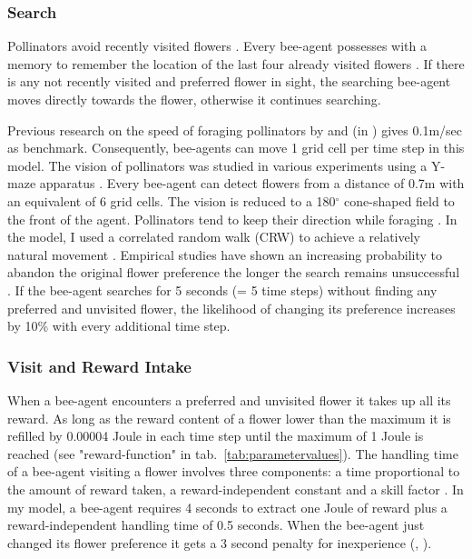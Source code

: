 \subsubsection*{Search}

Pollinators avoid recently visited flowers \citep{goulson1999foraging}. Every bee-agent possesses with a memory to remember the location of the last four already visited flowers \citep{goulson2000pollinators}. 
 If there is any not recently visited and preferred flower in sight, the searching bee-agent moves directly towards the flower, otherwise it continues searching. 

Previous research on the speed of foraging pollinators by \cite{essenberg2012explaining} and \cite{kunin1991few} (in  \citealt{kunin1996pollinator}) gives 0.1m/sec as benchmark. Consequently, bee-agents can move 1 grid cell per time step in this model. The vision of pollinators was studied in various experiments using a Y-maze apparatus \citep{dyer2008comparative, wertlen2008detection, ne2001effect}. Every bee-agent can detect flowers from a distance of 0.7m with an equivalent of 6 grid cells. The vision is reduced to a 180$^{\circ}$ cone-shaped field to the front of the agent. Pollinators tend to keep their direction while foraging \citep{waddington1980flight}. In the model, I used a correlated random walk (CRW) to achieve a relatively natural movement \citep{bartumeus2005animal, codling2008random,  pyke1992flight, viswanathan2008levy}. Empirical studies have shown an increasing probability to abandon the original flower preference the longer the search remains unsuccessful \citep{chittka1997foraging,kunin1993sex}. If the bee-agent searches for 5 seconds (= 5 time steps) without finding any preferred and unvisited flower, the likelihood of changing its preference increases by 10\% with every additional time step. \\

\subsubsection*{Visit and Reward Intake}

When a bee-agent encounters a preferred and unvisited flower it takes up all its reward. As long as the reward content of a flower lower than the maximum it is refilled by 0.00004 Joule in each time step until the maximum of 1 Joule is reached (see "reward-function" in tab.~\ref{tab:parametervalues}). The handling time of a bee-agent visiting a flower involves three components: a time proportional to the amount of reward taken, a reward-independent constant and a skill factor \citep{kunin1996pollinator}. In my model, a bee-agent requires 4 seconds to extract one Joule of reward plus a reward-independent handling time of 0.5 seconds. When the bee-agent just changed its flower preference it gets a 3 second penalty for inexperience (\citealt{roubik1992ecology}, \citealt{kunin1996pollinator}).

